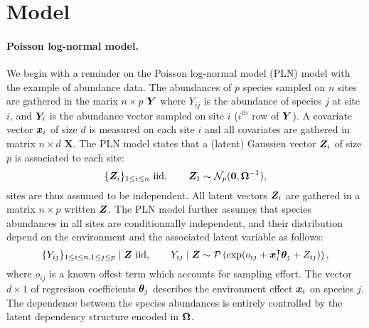 \section{Model}

\paragraph{Poisson log-normal model.} 
We begin with a reminder on the Poisson log-normal model (PLN) model with the example of abundance data. The abundances of $p$ species sampled on $n$ sites are gathered in the marix $n \times p$ $\boldsymbol{Y}$ where $Y_ {ij}$ is the abundance of species $j$ at site $i$, and $\boldsymbol{Y}_i $ is the abundance vector sampled on site $i$ ($i^{\text{th}}$ row of $\boldsymbol{Y}$). A covariate vector $\boldsymbol{x}_i $ of size $d$ is measured on each site $i$ and all covariates are gathered in matrix $n \times d$ $\boldsymbol X$. The PLN model states that a (latent) Gaussien vector $\boldsymbol{Z}_i$ of size $p$ is associated to each site:
\begin{equation} \label{eq:PLN-Z}
\{\boldsymbol{Z}_i\}_{1 \leq i \leq n} \text{ iid}, \qquad 
\boldsymbol{Z}_1 \sim \mathcal{N}_p(\boldsymbol{0}, \boldsymbol{\Omega}^{-1}),
\end{equation}
sites are thus assumed to be independent. All latent vectors $\boldsymbol{Z}_i$ are gathered in a matrix $n \times p$ written $\boldsymbol{Z}$. The PLN model further assumes that species abundances in all sites are conditionnally independent, and their distribution depend on the environment and the associated latent variable as follows:
\begin{equation} \label{eq:PLN-Y.Z}
\{Y_{ij}\}_{1 \leq i \leq n, 1 \leq j \leq p} \mid \boldsymbol{Z} \text{ iid}, \qquad 
Y_{ij} \mid \boldsymbol{Z} \sim \mathcal{P}\left(\exp(o_{ij} + \boldsymbol{x}_i^\intercal \boldsymbol{\theta}_j + Z_{ij})\right),
\end{equation}
where $o_{ij}$ is a known offest term which accounts for sampling effort. The vector $d \times 1$ of regresison coefficients $\boldsymbol{\theta}_j$ describes the environment effect $\boldsymbol{x}_i$ on species $j$. The dependence between the species abundances is entirely controlled by the latent dependency structure encoded in $\boldsymbol{\Omega}$.

